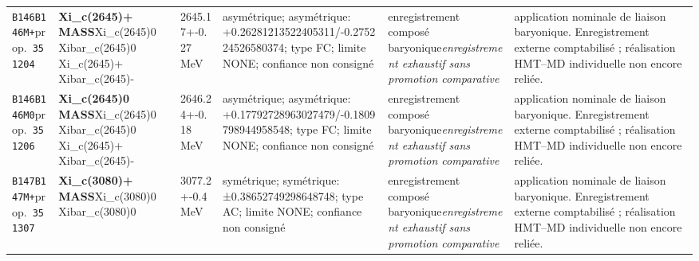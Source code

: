 \begin{landscape}
\begin{longtable}{L{1.85cm}L{4.45cm}L{2.35cm}L{4.05cm}L{3.35cm}L{7.15cm}}
\texttt{B146}\newline \texttt{B146M+}\newline prop.\ \texttt{351204} & \textbf{Xi\_\allowbreak{}c(2645)+ MASS}\newline Xi\_\allowbreak{}c(2645)0 \textbar{}\allowbreak{} Xibar\_\allowbreak{}c(2645)0 \textbar{}\allowbreak{} Xi\_\allowbreak{}c(2645)+ \textbar{}\allowbreak{} Xibar\_\allowbreak{}c(2645)- & 2645.17+-0.27\,MeV & asymétrique; asymétrique: +0.26281213522405311/-0.275224526580374; type FC; limite NONE; confiance non consigné & enregistrement composé baryonique\newline \emph{enregistrement exhaustif sans promotion comparative} & application nominale de liaison baryonique. Enregistrement externe comptabilisé ; réalisation HMT--MD individuelle non encore reliée. \\
\texttt{B146}\newline \texttt{B146M0}\newline prop.\ \texttt{351206} & \textbf{Xi\_\allowbreak{}c(2645)0 MASS}\newline Xi\_\allowbreak{}c(2645)0 \textbar{}\allowbreak{} Xibar\_\allowbreak{}c(2645)0 \textbar{}\allowbreak{} Xi\_\allowbreak{}c(2645)+ \textbar{}\allowbreak{} Xibar\_\allowbreak{}c(2645)- & 2646.24+-0.18\,MeV & asymétrique; asymétrique: +0.17792728963027479/-0.1809798944958548; type FC; limite NONE; confiance non consigné & enregistrement composé baryonique\newline \emph{enregistrement exhaustif sans promotion comparative} & application nominale de liaison baryonique. Enregistrement externe comptabilisé ; réalisation HMT--MD individuelle non encore reliée. \\
\texttt{B147}\newline \texttt{B147M+}\newline prop.\ \texttt{351307} & \textbf{Xi\_\allowbreak{}c(3080)+ MASS}\newline Xi\_\allowbreak{}c(3080)0 \textbar{}\allowbreak{} Xibar\_\allowbreak{}c(3080)0 & 3077.2+-0.4\,MeV & symétrique; symétrique: ±0.38652749298648748; type AC; limite NONE; confiance non consigné & enregistrement composé baryonique\newline \emph{enregistrement exhaustif sans promotion comparative} & application nominale de liaison baryonique. Enregistrement externe comptabilisé ; réalisation HMT--MD individuelle non encore reliée. \\

\end{longtable}
\end{landscape}
